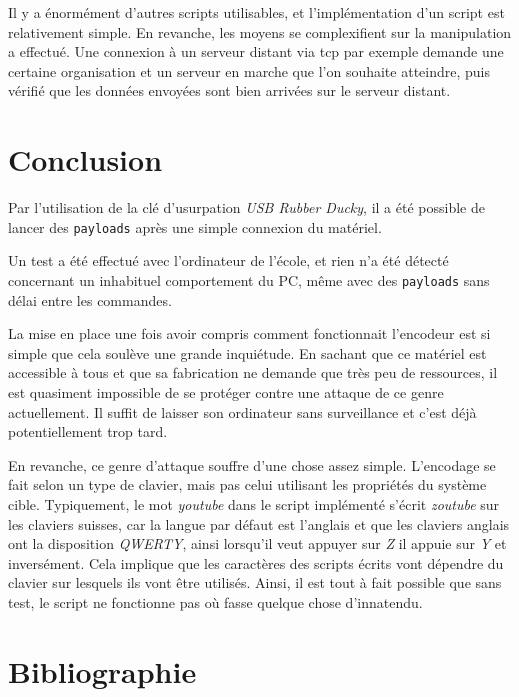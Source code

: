 \documentclass[
  french,
  paper=a4,
  ,captions=tableheading
]{scrartcl}
\begin{document}
Il y a énormément d'autres scripts utilisables, et l'implémentation d'un
script est relativement simple. En revanche, les moyens se complexifient
sur la manipulation a effectué. Une connexion à un serveur distant via
tcp par exemple demande une certaine organisation et un serveur en
marche que l'on souhaite atteindre, puis vérifié que les données
envoyées sont bien arrivées sur le serveur distant.

\hypertarget{conclusion}{%
\section{Conclusion}\label{conclusion}}

Par l'utilisation de la clé d'usurpation \emph{USB Rubber Ducky}, il a
été possible de lancer des \texttt{payloads} après une simple connexion
du matériel.

Un test a été effectué avec l'ordinateur de l'école, et rien n'a été
détecté concernant un inhabituel comportement du PC, même avec des
\texttt{payloads} sans délai entre les commandes.

La mise en place une fois avoir compris comment fonctionnait l'encodeur
est si simple que cela soulève une grande inquiétude. En sachant que ce
matériel est accessible à tous et que sa fabrication ne demande que très
peu de ressources, il est quasiment impossible de se protéger contre une
attaque de ce genre actuellement. Il suffit de laisser son ordinateur
sans surveillance et c'est déjà potentiellement trop tard.

En revanche, ce genre d'attaque souffre d'une chose assez simple.
L'encodage se fait selon un type de clavier, mais pas celui utilisant
les propriétés du système cible. Typiquement, le mot \emph{youtube} dans
le script implémenté s'écrit \emph{zoutube} sur les claviers suisses,
car la langue par défaut est l'anglais et que les claviers anglais ont
la disposition \emph{QWERTY}, ainsi lorsqu'il veut appuyer sur \emph{Z}
il appuie sur \emph{Y} et inversément. Cela implique que les caractères
des scripts écrits vont dépendre du clavier sur lesquels ils vont être
utilisés. Ainsi, il est tout à fait possible que sans test, le script ne
fonctionne pas où fasse quelque chose d'innatendu.

\hypertarget{bibliographie}{%
\section{Bibliographie}\label{bibliographie}}
\end{document}
